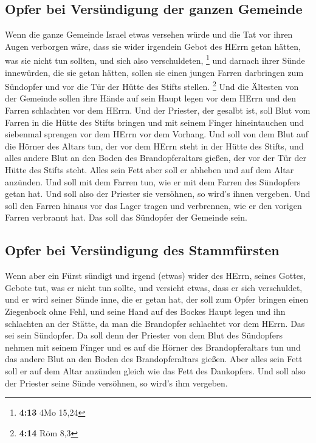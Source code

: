\hypertarget{opfer-bei-versuxfcndigung-der-ganzen-gemeinde}{%
\subsection{Opfer bei Versündigung der ganzen
Gemeinde}\label{opfer-bei-versuxfcndigung-der-ganzen-gemeinde}}

 Wenn die ganze Gemeinde Israel etwas versehen würde und
die Tat vor ihren Augen verborgen wäre, dass sie wider irgendein Gebot
des HErrn getan hätten, was sie nicht tun sollten, und sich also
verschuldeten, \footnote{\textbf{4:13} 4Mo 15,24}  und
darnach ihrer Sünde innewürden, die sie getan hätten, sollen sie einen
jungen Farren darbringen zum Sündopfer und vor die Tür der Hütte des
Stifts stellen. \footnote{\textbf{4:14} Röm 8,3}  Und die
Ältesten von der Gemeinde sollen ihre Hände auf sein Haupt legen vor dem
HErrn und den Farren schlachten vor dem HErrn.  Und der
Priester, der gesalbt ist, soll Blut vom Farren in die Hütte des Stifts
bringen  und mit seinem Finger hineintauchen und
siebenmal sprengen vor dem HErrn vor dem Vorhang.  Und
soll von dem Blut auf die Hörner des Altars tun, der vor dem HErrn steht
in der Hütte des Stifts, und alles andere Blut an den Boden des
Brandopferaltars gießen, der vor der Tür der Hütte des Stifts steht.
 Alles sein Fett aber soll er abheben und auf dem Altar
anzünden.  Und soll mit dem Farren tun, wie er mit dem
Farren des Sündopfers getan hat. Und soll also der Priester sie
versöhnen, so wird's ihnen vergeben.  Und soll den Farren
hinaus vor das Lager tragen und verbrennen, wie er den vorigen Farren
verbrannt hat. Das soll das Sündopfer der Gemeinde sein.

\hypertarget{opfer-bei-versuxfcndigung-des-stammfuxfcrsten}{%
\subsection{Opfer bei Versündigung des
Stammfürsten}\label{opfer-bei-versuxfcndigung-des-stammfuxfcrsten}}

 Wenn aber ein Fürst sündigt und irgend (etwas) wider des
HErrn, seines Gottes, Gebote tut, was er nicht tun sollte, und versieht
etwas, dass er sich verschuldet,  und er wird seiner
Sünde inne, die er getan hat, der soll zum Opfer bringen einen
Ziegenbock ohne Fehl,  und seine Hand auf des Bockes
Haupt legen und ihn schlachten an der Stätte, da man die Brandopfer
schlachtet vor dem HErrn. Das sei sein Sündopfer.  Da
soll denn der Priester von dem Blut des Sündopfers nehmen mit seinem
Finger und es auf die Hörner des Brandopferaltars tun und das andere
Blut an den Boden des Brandopferaltars gießen.  Aber
alles sein Fett soll er auf dem Altar anzünden gleich wie das Fett des
Dankopfers. Und soll also der Priester seine Sünde versöhnen, so wird's
ihm vergeben.

